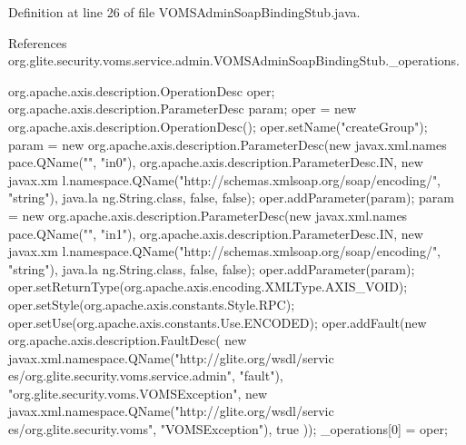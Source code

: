 Definition at line 26 of file VOMSAdminSoapBindingStub.java.



References org.glite.security.voms.service.admin.VOMSAdminSoapBindingStub.\_\-operations.


\begin{DoxyCode}
                                             {
        org.apache.axis.description.OperationDesc oper;
        org.apache.axis.description.ParameterDesc param;
        oper = new org.apache.axis.description.OperationDesc();
        oper.setName("createGroup");
        param = new org.apache.axis.description.ParameterDesc(new javax.xml.names
      pace.QName("", "in0"), org.apache.axis.description.ParameterDesc.IN, new javax.xm
      l.namespace.QName("http://schemas.xmlsoap.org/soap/encoding/", "string"), java.la
      ng.String.class, false, false);
        oper.addParameter(param);
        param = new org.apache.axis.description.ParameterDesc(new javax.xml.names
      pace.QName("", "in1"), org.apache.axis.description.ParameterDesc.IN, new javax.xm
      l.namespace.QName("http://schemas.xmlsoap.org/soap/encoding/", "string"), java.la
      ng.String.class, false, false);
        oper.addParameter(param);
        oper.setReturnType(org.apache.axis.encoding.XMLType.AXIS_VOID);
        oper.setStyle(org.apache.axis.constants.Style.RPC);
        oper.setUse(org.apache.axis.constants.Use.ENCODED);
        oper.addFault(new org.apache.axis.description.FaultDesc(
                      new javax.xml.namespace.QName("http://glite.org/wsdl/servic
      es/org.glite.security.voms.service.admin", "fault"),
                      "org.glite.security.voms.VOMSException",
                      new javax.xml.namespace.QName("http://glite.org/wsdl/servic
      es/org.glite.security.voms", "VOMSException"), 
                      true
                     ));
        _operations[0] = oper;

}
\end{DoxyCode}
